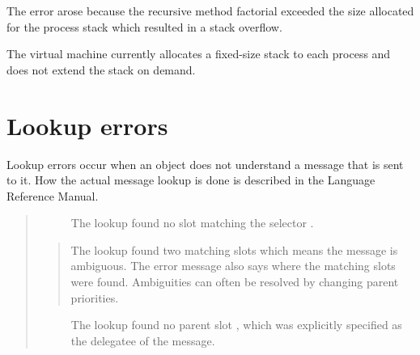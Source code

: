 \documentclass[letterpaper,10pt,english]{sphinxmanual}
\begin{document}
The error arose because the recursive method factorial exceeded the size allocated for the process
stack which resulted in a stack overflow.

The virtual machine currently allocates a fixed-size stack to each process and does not extend the stack on demand.


\section{Lookup errors}
\label{vmref:lookup-errors}
Lookup errors occur when an object does not understand a message that is sent to it. How the actual
message lookup is done is described in the Language Reference Manual.
\begin{quote}
\begin{description}
\item[{}] \leavevmode
The lookup found no slot matching the selector .

\end{description}

\begin{DUlineblock}{0em}
\item[]
\begin{DUlineblock}{\DUlineblockindent}
\item[] 
\end{DUlineblock}
\item[] 
\end{DUlineblock}
\begin{quote}

The lookup found two matching  slots which means the message is ambiguous. The
error message also says where the matching slots were found.    Ambiguities can often be
resolved by changing parent priorities.
\end{quote}
\begin{description}
\item[{}] \leavevmode
The lookup found no parent slot , which was explicitly specified as the delegatee
of the message.

\end{description}
\end{quote}
\end{document}
